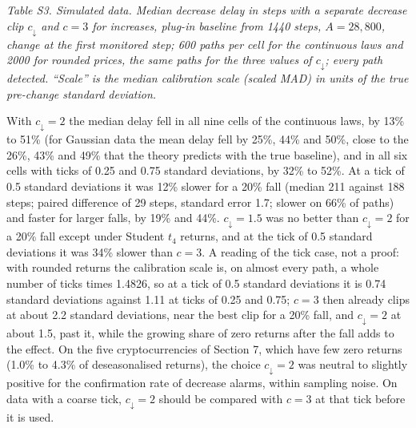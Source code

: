 \documentclass[
]{article}
\begin{document}
\emph{Table S3. Simulated data. Median decrease delay in steps with a
separate decrease clip \(c_{\downarrow}\) and \(c = 3\) for increases,
plug-in baseline from 1440 steps, \(A = 28{,}800\), change at the first
monitored step; 600 paths per cell for the continuous laws and 2000 for
rounded prices, the same paths for the three values of
\(c_{\downarrow}\); every path detected. ``Scale'' is the median
calibration scale (scaled MAD) in units of the true pre-change standard
deviation.}

With \(c_{\downarrow} = 2\) the median delay fell in all nine cells of
the continuous laws, by 13\% to 51\% (for Gaussian data the mean delay
fell by 25\%, 44\% and 50\%, close to the 26\%, 43\% and 49\% that the
theory predicts with the true baseline), and in all six cells with ticks
of 0.25 and 0.75 standard deviations, by 32\% to 52\%. At a tick of 0.5
standard deviations it was 12\% slower for a 20\% fall (median 211
against 188 steps; paired difference of 29 steps, standard error 1.7;
slower on 66\% of paths) and faster for larger falls, by 19\% and 44\%.
\(c_{\downarrow} = 1.5\) was no better than \(c_{\downarrow} = 2\) for a
20\% fall except under Student \(t_4\) returns, and at the tick of 0.5
standard deviations it was 34\% slower than \(c = 3\). A reading of the
tick case, not a proof: with rounded returns the calibration scale is,
on almost every path, a whole number of ticks times 1.4826, so at a tick
of 0.5 standard deviations it is 0.74 standard deviations against 1.11
at ticks of 0.25 and 0.75; \(c = 3\) then already clips at about 2.2
standard deviations, near the best clip for a 20\% fall, and
\(c_{\downarrow} = 2\) at about 1.5, past it, while the growing share of
zero returns after the fall adds to the effect. On the five
cryptocurrencies of Section 7, which have few zero returns (1.0\% to
4.3\% of deseasonalised returns), the choice \(c_{\downarrow} = 2\) was
neutral to slightly positive for the confirmation rate of decrease
alarms, within sampling noise. On data with a coarse tick,
\(c_{\downarrow} = 2\) should be compared with \(c = 3\) at that tick
before it is used.
\end{document}
